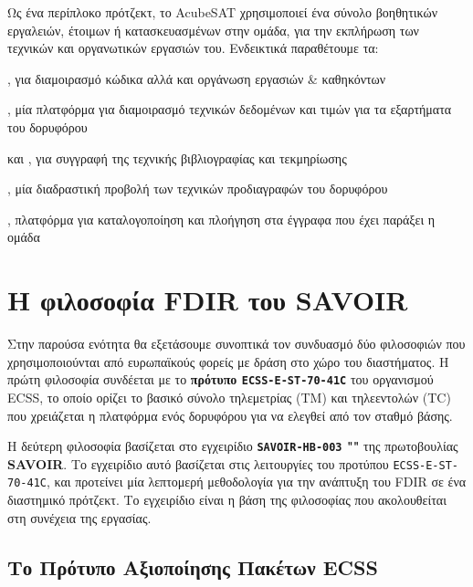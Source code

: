 \documentclass[a4paper,nobib]{tufte-book}
\begin{document}
Ως ένα περίπλοκο πρότζεκτ, το AcubeSAT χρησιμοποιεί ένα σύνολο βοηθητικών εργαλειών, έτοιμων ή κατασκευασμένων στην ομάδα, για την εκπλήρωση των τεχνικών και οργανωτικών εργασιών του. Ενδεικτικά παραθέτουμε τα:
\begin{compactitem}
	\item {}, για διαμοιρασμό κώδικα αλλά και οργάνωση εργασιών \& καθηκόντων
	\item {}, μία πλατφόρμα για διαμοιρασμό τεχνικών δεδομένων και τιμών για τα εξαρτήματα του δορυφόρου
	\item  {} και , για συγγραφή της τεχνικής βιβλιογραφίας και τεκμηρίωσης
	\item {}, μία διαδραστική προβολή των τεχνικών προδιαγραφών του δορυφόρου
	\item {}, πλατφόρμα για καταλογοποίηση και πλοήγηση στα έγγραφα που έχει παράξει η ομάδα
\end{compactitem}

\chapter{Η φιλοσοφία \ac{FDIR} του SAVOIR}
\label{cap:savoir}

Στην παρούσα ενότητα θα εξετάσουμε συνοπτικά τον συνδυασμό δύο φιλοσοφιών που χρησιμοποιούνται από ευρωπαϊκούς φορείς με δράση στο χώρο του διαστήματος. Η πρώτη φιλοσοφία συνδέεται με το \textbf{πρότυπο \texttt{ECSS-E-ST-70-41C}} \autocite{ECSS-E-ST-70-41C} του οργανισμού \acf{ECSS}, το οποίο ορίζει το βασικό σύνολο τηλεμετρίας (\acs{TM}) και τηλεεντολών (\acs{TC}) που χρειάζεται η πλατφόρμα ενός δορυφόρου για να ελεγθεί από τον σταθμό βάσης.

Η δεύτερη φιλοσοφία βασίζεται στο εγχειρίδιο \textbf{\texttt{SAVOIR-HB-003} ""} \autocite{SAVOIR-HB-003} της πρωτοβουλίας \textbf{\acf{SAVOIR}}. Το εγχειρίδιο αυτό βασίζεται στις λειτουργίες του προτύπου \texttt{ECSS-E-ST-70-41C}, και προτείνει μία λεπτομερή μεθοδολογία για την ανάπτυξη του \ac{FDIR} σε ένα διαστημικό πρότζεκτ. Το εγχειρίδιο είναι η βάση της φιλοσοφίας που ακολουθείται στη συνέχεια της εργασίας.

\section{Το Πρότυπο Αξιοποίησης Πακέτων \acs{ECSS}}
\end{document}
